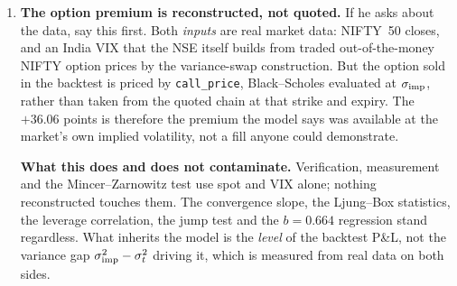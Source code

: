 \documentclass[11pt,a4paper]{article}
\begin{document}
\begin{enumerate}[leftmargin=*,topsep=1pt,itemsep=3pt]
\item \textbf{The option premium is reconstructed, not quoted.} If he asks about the data,
      say this first. Both \emph{inputs} are real market data: NIFTY~50 closes, and an India
      VIX that the NSE itself builds from traded out-of-the-money NIFTY option prices by the
      variance-swap construction. But the option sold in the backtest is priced by
      \texttt{call\_price}, Black--Scholes evaluated at $\sigma_{\mathrm{imp}}$, rather than taken from the
      quoted chain at that strike and expiry. The $+36.06$ points is therefore the premium the
      model says was available at the market's own implied volatility, not a fill anyone could
      demonstrate.

      \smallskip
      \textbf{What this does and does not contaminate.} Verification, measurement and the
      Mincer--Zarnowitz test use spot and VIX alone; nothing reconstructed touches them. The
      convergence slope, the Ljung--Box statistics, the leverage correlation, the jump test and
      the $b=0.664$ regression stand regardless. What inherits the model is the \emph{level} of
      the backtest P\&L, not the variance gap $\sigma_{\mathrm{imp}}^2-\sigma_t^2$ driving it, which is
      measured from real data on both sides.


\end{enumerate}
\end{document}
